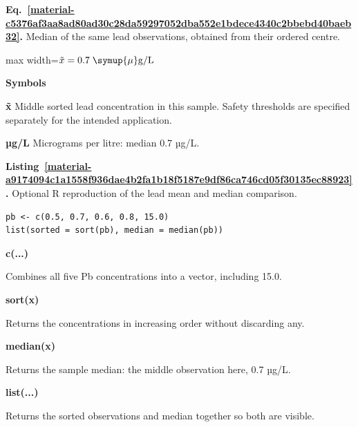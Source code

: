 \documentclass[11pt,a4paper]{article}
\newcounter{listing}
\begin{document}
\par\medskip
\noindent\begin{minipage}{\linewidth}
\label{material-c5376af3aa8ad80ad30c28da59297052dba552e1bdece4340c2bbebd40baeb32}
\noindent\textbf{Eq.~\ref*{material-c5376af3aa8ad80ad30c28da59297052dba552e1bdece4340c2bbebd40baeb32}.} Median of the same lead observations, obtained from their ordered centre.\par\nopagebreak
\begin{center}\begin{adjustbox}{max width=\linewidth}$\displaystyle \tilde{x}=0.7\;\symup{\mu}\mathrm{g/L}$\end{adjustbox}\end{center}

\par\noindent\textbf{Symbols}

\par\noindent\textbf{x̃} Middle sorted lead concentration in this sample. Safety thresholds are specified separately for the intended application.

\par\noindent\textbf{µg/L} Micrograms per litre: median 0.7 µg/L.

\end{minipage}\par
\medskip

\par\medskip
{}
\label{material-a9174094c1a1558f936dae4b2fa1b18f5187e9df86ca746cd05f30135ec88923}
\noindent\textbf{Listing~\ref*{material-a9174094c1a1558f936dae4b2fa1b18f5187e9df86ca746cd05f30135ec88923}.} Optional R reproduction of the lead mean and median comparison.\par\nopagebreak
\begin{Verbatim}[fontsize=\footnotesize,breaklines=true,breakanywhere=true]
pb <- c(0.5, 0.7, 0.6, 0.8, 15.0)
list(sorted = sort(pb), median = median(pb))
\end{Verbatim}

\par\noindent\textbf{c(...)}

Combines all five Pb concentrations into a vector, including 15.0.

\par\noindent\textbf{sort(x)}

Returns the concentrations in increasing order without discarding any.

\par\noindent\textbf{median(x)}

Returns the sample median: the middle observation here, 0.7 µg/L.

\par\noindent\textbf{list(...)}

Returns the sorted observations and median together so both are visible.

\medskip
\end{document}
